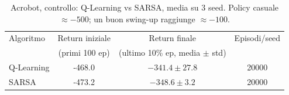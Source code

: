 \begin{table}[htbp]
\centering
\caption{Acrobot, controllo: Q-Learning vs SARSA, media su 3 seed. Policy casuale $\approx -500$; un buon swing-up raggiunge $\approx -100$.}
\label{tab:acrobot-control}
\begin{tabular}{lccc}
\toprule
Algoritmo & Return iniziale & Return finale & Episodi/seed \\
          & (primi 100 ep) & (ultimo 10\% ep, media $\pm$ std) & \\
\midrule
Q-Learning & -468.0 & $-341.4 \pm 27.8$ & 20000 \\
SARSA & -473.2 & $-348.6 \pm 3.2$ & 20000 \\
\bottomrule
\end{tabular}
\end{table}
